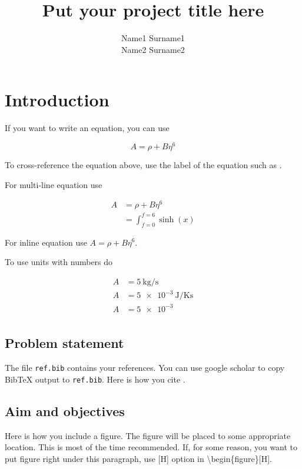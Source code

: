 \documentclass{template}
\title{Put your project title here}
\author{Name1 Surname1\\Name2 Surname2}
\begin{document}
\chapter{Introduction}\label{ch:in}

If you want to write an equation, you can use

\begin{equation}\label{eq:A}
A = \rho + B\eta^6
\end{equation}

To cross-reference the equation above, use the label of the equation such as .

For multi-line equation use

\begin{equation}
\begin{aligned}
A &= \rho + B\eta^6\\
  &= \int_{f=0}^{f=6} \sinh(x)
\end{aligned}
\end{equation}

For inline equation use $A = \rho + B\eta^6$.

To use units with numbers do

\begin{equation}
\begin{aligned}
A &= \SI{5}{\kg\per\s}\\
A &= \SI{5e-3}{\joule\per\kelvin\s}\\
A &= \num{5e-3}\\
\end{aligned}
\end{equation}


\section{Problem statement}

The file \texttt{ref.bib} contains your references. You can use google scholar to copy BibTeX output to \texttt{ref.bib}. Here is how you cite \cite{gulawani2006cfd}.

\section{Aim and objectives}

Here is how you include a figure. The figure will be placed to some appropriate location. This is most of the time recommended. If, for some reason, you want to put figure right under this paragraph, use [H] option in \textbackslash begin\{figure\}[H].
\end{document}
